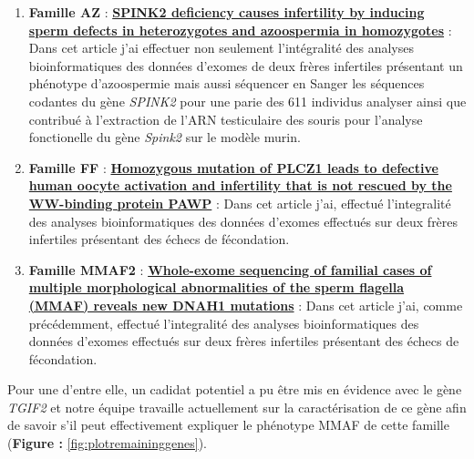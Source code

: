 \documentclass[12pt,twoside]{reedthesis}
\providecommand{\tightlist}{%
  \setlength{\itemsep}{0pt}\setlength{\parskip}{0pt}}
\theoremstyle{definition}
\theoremstyle{definition}
\theoremstyle{remark}
\begin{document}
  \begin{enumerate}
  \def\labelenumi{\arabic{enumi}.}
  \tightlist
  \item
    \textbf{Famille AZ} : \protect\hyperlink{spink2}{\textbf{SPINK2
    deficiency causes infertility by inducing sperm defects in
    heterozygotes and azoospermia in homozygotes}} : Dans cet article j'ai
    effectuer non seulement l'intégralité des analyses bioinformatiques
    des données d'exomes de deux frères infertiles présentant un phénotype
    d'azoospermie mais aussi séquencer en Sanger les séquences codantes du
    gène \emph{SPINK2} pour une parie des 611 individus analyser ainsi que
    contribué à l'extraction de l'ARN testiculaire des souris pour
    l'analyse fonctionelle du gène \emph{Spink2} sur le modèle murin.\\
  \item
    \textbf{Famille FF} : \protect\hyperlink{plcz}{\textbf{Homozygous
    mutation of PLCZ1 leads to defective human oocyte activation and
    infertility that is not rescued by the WW-binding protein PAWP}} :
    Dans cet article j'ai, effectué l'integralité des analyses
    bioinformatiques des données d'exomes effectués sur deux frères
    infertiles présentant des échecs de fécondation.\\
  \item
    \textbf{Famille MMAF2} :
    \protect\hyperlink{famdnah1}{\textbf{Whole-exome sequencing of
    familial cases of multiple morphological abnormalities of the sperm
    flagella (MMAF) reveals new DNAH1 mutations}} : Dans cet article j'ai,
    comme précédemment, effectué l'integralité des analyses
    bioinformatiques des données d'exomes effectués sur deux frères
    infertiles présentant des échecs de fécondation.
  \end{enumerate}
  
  Pour une d'entre elle, un cadidat potentiel a pu être mis en évidence
  avec le gène \emph{TGIF2} et notre équipe travaille actuellement sur la
  caractérisation de ce gène afin de savoir s'il peut effectivement
  expliquer le phénotype MMAF de cette famille (\textbf{Figure :
  }\ref{fig:plotremaininggenes}).
  
\end{document}
